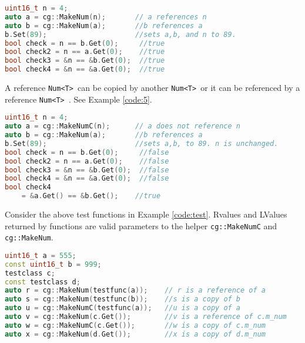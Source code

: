 \documentclass{article}
\newcommand{\theobj}{\protect\Verb+Num<T> +}
\begin{document}
\begin{lstlisting}[language=C++, label=code:4, caption=MakeNum with cg::MakeNum]
uint16_t n = 4;
auto a = cg::MakeNum(n);       // a references n
auto b = cg::MakeNum(a);       //b references a
b.Set(89);                     //sets a,b, and n to 89.
bool check = n == b.Get(0);     //true
bool check2 = n == a.Get(0);    //true
bool check3 = &n == &b.Get(0);  //true
bool check4 = &n == &a.Get(0);  //true
\end{lstlisting}
\pagebreak
A reference \theobj can be copied by another \theobj or it can be referenced by a reference \theobj. See Example \vref{code:5}.

\begin{lstlisting}[language=C++, label=code:5, caption=Referencing a Copy]
uint16_t n = 4;
auto a = cg::MakeNumC(n);      // a does not reference n
auto b = cg::MakeNum(a);       //b references a
b.Set(89);                     //sets a,b, to 89. n is unchanged.
bool check = n == b.Get(0);     //false
bool check2 = n == a.Get(0);    //false
bool check3 = &n == &b.Get(0);  //false
bool check4 = &n == &a.Get(0);  //false
bool check4 
	= &a.Get() == &b.Get();    //true
\end{lstlisting}

Consider the above test functions in Example \vref{code:test}.  Rvalues and LValues returned by functions are valid parameters to the helper \Verb+cg::MakeNumC+ and \Verb+cg::MakeNum+.

\begin{lstlisting}[language=C++, label=code:5, caption=Rval and Lval returns]
uint16_t a = 555;
const uint16_t b = 999;
testclass c;
const testclass d;
auto r = cg::MakeNum(testfunc(a));    // r is a reference of a
auto s = cg::MakeNum(testfunc(b));    //s is a copy of b
auto u = cg::MakeNumC(testfunc(a));   //u is a copy of a
auto v = cg::MakeNum(c.Get());        //v is a reference of c.m_num
auto w = cg::MakeNumC(c.Get());       //w is a copy of c.m_num
auto x = cg::MakeNum(d.Get());        //x is a copy of d.m_num
\end{lstlisting}
\end{document}
